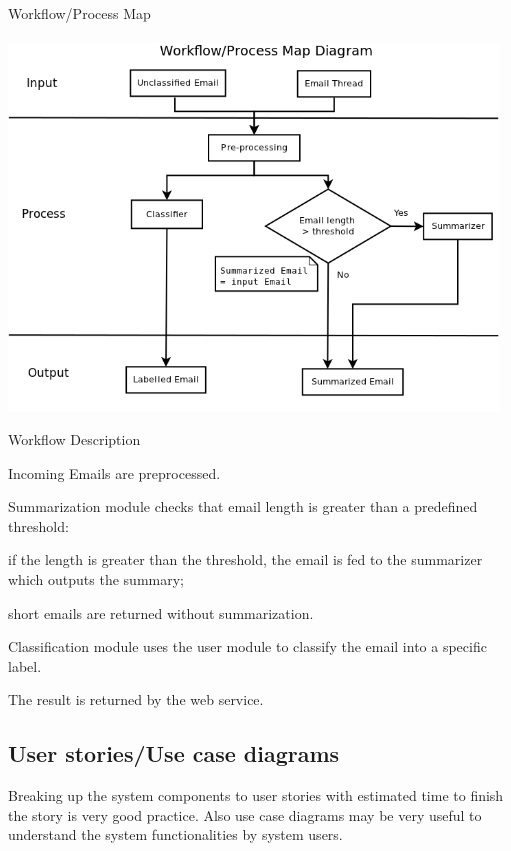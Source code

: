 \documentclass[a4paper,10pt]{article}
\newenvironment{my_itemize}
{\begin{itemize}
  \setlength{\itemsep}{0cm}
  \setlength{\parskip}{0cm}}
{\end{itemize}}
\newenvironment{my_enumerate}
{\begin{enumerate}
  \setlength{\itemsep}{0cm}
  \setlength{\parskip}{0cm}}
{\end{enumerate}}
\begin{document}
\begin{my_enumerate}
  \item Workflow/Process Map \\ \\
	\includegraphics[width=13cm]{workflow_process_map.png}
  \item Workflow Description
  \begin{my_itemize}
    \item Incoming Emails are preprocessed.
    \item Summarization module checks that email length is greater than a predefined threshold:
    \begin{my_itemize}
      \item if the length is greater than the threshold, the email is fed to the 
	    summarizer which outputs the summary;
      \item short emails are returned without summarization.
    \end{my_itemize}
    \item Classification module uses the user module to classify the email into a specific label.
    \item The result is returned by the web service.
  \end{my_itemize}
\end{my_enumerate}

\subsection{User stories/Use case diagrams}
Breaking up the system components to user stories with estimated time to finish
the story is very good practice. Also use case diagrams may be very useful to understand
the system functionalities by system users.
\\
\end{document}
